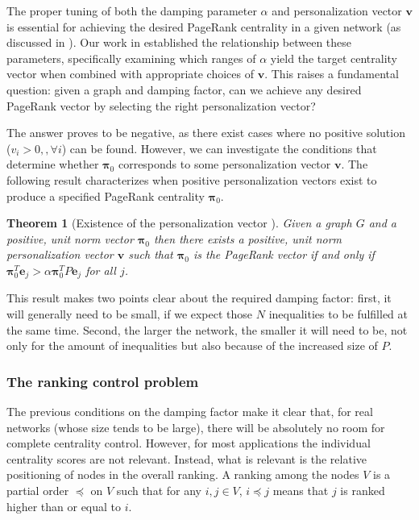 \documentclass[sn-mathphys-ay]{sn-jnl}%
\newcommand{\bv}{\bm{v}}
\theoremstyle{thmstyleone}%
\newtheorem{theorem}{Theorem}%
\theoremstyle{thmstyletwo}%
\theoremstyle{thmstylethree}%
\begin{document}
The proper tuning of both the damping parameter $\alpha$ and personalization vector $\bv$ is essential for achieving the desired PageRank centrality in a given network (as discussed in \cite{boldi2005pagerank, garcia2012localization}). Our work in \cite{contrerasaso2023pagerank} established the relationship between these parameters, specifically examining which ranges of $\alpha$ yield the target centrality vector when combined with appropriate choices of $\bv$. This raises a fundamental question: given a graph and damping factor, can we achieve any desired PageRank vector by selecting the right personalization vector?

The answer proves to be negative, as there exist cases where no positive solution ($v_i>0,, \forall i$) can be found. However, we can investigate the conditions that determine whether $\bm{\pi}_0$ corresponds to some personalization vector $\bm{v}$. The following result characterizes when positive personalization vectors exist to produce a specified PageRank centrality $\bm{\pi}_0$.

\begin{theorem}[Existence of the personalization vector \cite{contrerasaso2023pagerank}]\label{prop-existencev}
	Given a graph $G$ and a positive, unit norm vector $\bm{\pi}_0$ then there exists a positive, unit norm personalization vector $\bm{v}$ such that $\bm{\pi}_0$ is the PageRank vector if and only if $\bm{\pi}_0^T \bm{e}_j > \alpha \bm{\pi}_0^T P \bm{e}_j$ for all $j$.
\end{theorem}

This result makes two points clear about the required damping factor: first, it will generally need to be small, if we expect those $N$ inequalities to be fulfilled at the same time. Second, the larger the network, the smaller it will need to be, not only for the amount of inequalities but also because of the increased size of $P$.





\subsubsection{The ranking control problem}\label{sec:ranking}


The previous conditions on the damping factor make it clear that, for real networks (whose size tends to be large), there will be absolutely no room for complete centrality control. However, for most applications the individual centrality scores are not relevant. Instead, what is relevant is the relative positioning of nodes in the overall ranking. A ranking among the nodes $V$ is a partial order $\preceq$ on $V$ such that for any $i,j\in V$, $i\preceq j$ means that $j$ is ranked higher than or equal to $i$. 
\end{document}
